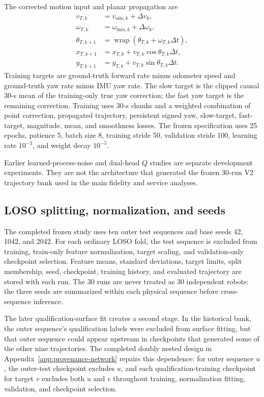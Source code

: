 \documentclass[journal,onecolumn]{IEEEtran}
\begin{document}
The corrected motion input and planar propagation are
\begin{align}
v_{T,k}&=v_{\mathrm{odo},k}+\Delta v_k,\\
\omega_{T,k}&=\omega_{\mathrm{imu},k}+\Delta\omega_k,\\
\theta_{T,k+1}&=\operatorname{wrap}(\theta_{T,k}+\omega_{T,k}\Delta t),\\
x_{T,k+1}&=x_{T,k}+v_{T,k}\cos\theta_{T,k}\Delta t,\\
y_{T,k+1}&=y_{T,k}+v_{T,k}\sin\theta_{T,k}\Delta t.
\end{align}
Training targets are ground-truth forward rate minus odometer speed and ground-truth yaw rate minus IMU yaw rate. The slow target is the clipped causal 30-s mean of the training-only true yaw correction; the fast yaw target is the remaining correction. Training uses 30-s chunks and a weighted combination of point correction, propagated trajectory, persistent signed yaw, slow-target, fast-target, magnitude, mean, and smoothness losses. The frozen specification uses 25 epochs, patience 5, batch size 8, training stride 50, validation stride 100, learning rate $10^{-3}$, and weight decay $10^{-5}$.

Earlier learned-process-noise and dual-head $Q$ studies are separate development experiments. They are not the architecture that generated the frozen 30-run V2 trajectory bank used in the main fidelity and service analyses.

\subsection{LOSO splitting, normalization, and seeds}
The completed frozen study uses ten outer test sequences and base seeds 42, 1042, and 2042. For each ordinary LOSO fold, the test sequence is excluded from training, train-only feature normalization, target scaling, and validation-only checkpoint selection. Feature means, standard deviations, target limits, split membership, seed, checkpoint, training history, and evaluated trajectory are stored with each run. The 30 runs are never treated as 30 independent robots: the three seeds are summarized within each physical sequence before cross-sequence inference.

The later qualification-surface fit creates a second stage. In the historical bank, the outer sequence's qualification labels were excluded from surface fitting, but that outer sequence could appear upstream in checkpoints that generated some of the other nine trajectories. The completed doubly nested design in Appendix~\ref{app:provenance-network} repairs this dependence: for outer sequence $u$, the outer-test checkpoint excludes $u$, and each qualification-training checkpoint for target $v$ excludes both $u$ and $v$ throughout training, normalization fitting, validation, and checkpoint selection.
\end{document}

